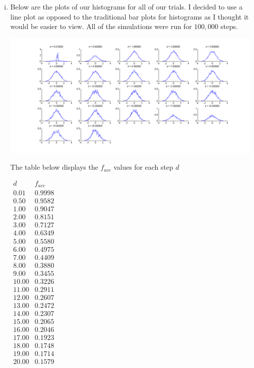 \documentclass{article}
\begin{document}
\begin{enumerate}[i.]
  \item Below are the plots of our histograms for all of our trials. I decided to use a line plot as opposed to the traditional bar plots for histograms as I thought it would be easier to view. All of the simulations were run for $100,000$ steps.

      \includegraphics[scale=0.5]{prob2c}

    The table below displays the $f_{acc}$ values for each step $d$\\
    \begin{center}
    $\begin{array}{c|c}
      d & f_{acc} \\ 
      0.01 & 0.9998 \\ 
      0.50 & 0.9582 \\ 
      1.00 & 0.9047 \\ 
      2.00 & 0.8151 \\ 
      3.00 & 0.7127 \\ 
      4.00 & 0.6349 \\ 
      5.00 & 0.5580 \\ 
      6.00 & 0.4975 \\ 
      7.00 & 0.4409 \\ 
      8.00 & 0.3880 \\ 
      9.00 & 0.3455 \\ 
      10.00 & 0.3226 \\ 
      11.00 & 0.2911 \\ 
      12.00 & 0.2607 \\ 
      13.00 & 0.2472 \\ 
      14.00 & 0.2307 \\ 
      15.00 & 0.2065 \\ 
      16.00 & 0.2046 \\ 
      17.00 & 0.1923 \\ 
      18.00 & 0.1748 \\ 
      19.00 & 0.1714 \\ 
      20.00 & 0.1579 \\ 
    \end{array}$
    \end{center}


\end{enumerate}
\end{document}
